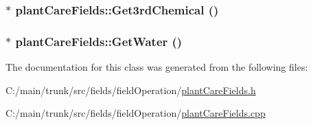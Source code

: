 \label{classplant_care_fields_a8f8e515e160373683a252690cc5f5cb2}
\hypertarget{classplant_care_fields_a2b8d91a57e0e212f7384093b53d20413}{
\subsubsection[{Get3rdChemical}]{$\ast$ plantCareFields::Get3rdChemical ()}}
\label{classplant_care_fields_a2b8d91a57e0e212f7384093b53d20413}
\hypertarget{classplant_care_fields_ab9f4b5a42d87b3b47e1ac6772da03888}{
\subsubsection[{GetWater}]{$\ast$ plantCareFields::GetWater ()}}
\label{classplant_care_fields_ab9f4b5a42d87b3b47e1ac6772da03888}


The documentation for this class was generated from the following files:\begin{DoxyCompactItemize}
\item 
C:/main/trunk/src/fields/fieldOperation/\hyperlink{plant_care_fields_8h}{plantCareFields.h}\item 
C:/main/trunk/src/fields/fieldOperation/\hyperlink{plant_care_fields_8cpp}{plantCareFields.cpp}\end{DoxyCompactItemize}

